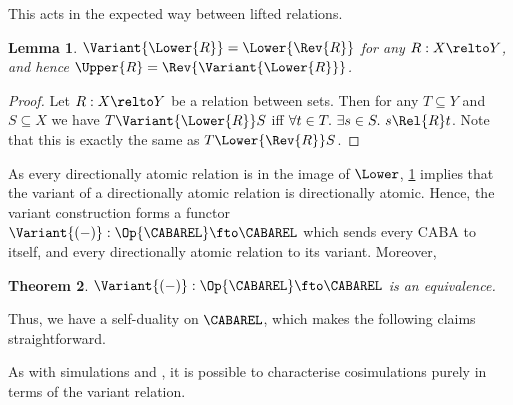\documentclass[10pt,a4paper]{article}
\newtheorem{theorem}{Theorem}
\newtheorem{lemma}[theorem]{Lemma}
\begin{document}
This acts in the expected way between lifted relations.
\begin{lemma}
  \label{lemma:variant-lower}
  \(\Variant{\Lower{R}} = \Lower{\Rev{R}}\) for any \(R : X \relto Y\), and
  hence \(\Upper{R} = \Rev{\Variant{\Lower{R}}}\).
\end{lemma}
\begin{proof}
  Let \(R : X \relto Y\) be a relation between sets. Then for any
  \(T \subseteq Y\) and \(S \subseteq X\) we have \(T \Variant{\Lower{R}} S\)
  iff \(\forall t \in T.\ \exists s \in S.\ s \Rel{R} t\). Note that this is
  exactly the same as \(T \Lower{\Rev{R}} S\).
\end{proof}
As every directionally atomic relation is in the image of $\Lower$,
\cref{lemma:variant-lower} implies that the variant of a directionally atomic
relation is directionally atomic. Hence, the variant construction forms a
functor \(\Variant{(-)} : \Op{\CABAREL} \fto \CABAREL\) which sends every CABA
to itself, and every directionally atomic relation to its variant. Moreover,
\begin{theorem}
  \(\Variant{(-)} : \Op{\CABAREL} \fto \CABAREL\) is an equivalence.
\end{theorem}
Thus, we have a self-duality on $\CABAREL$, which makes the following
claims straightforward.

As with simulations and , it is possible to characterise
cosimulations purely in terms of the variant relation.
\end{document}
